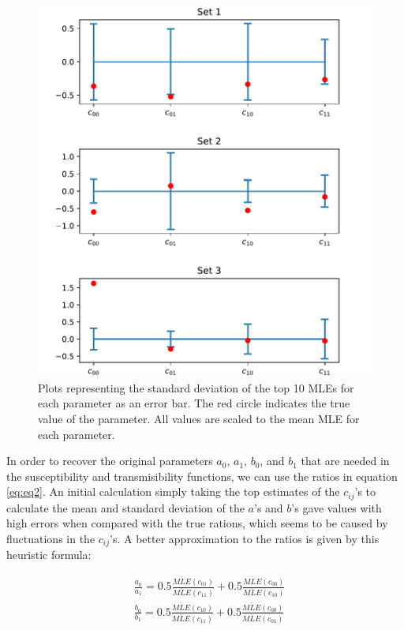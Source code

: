 \documentclass{article}
\begin{document}
\begin{figure} %
  \centering
  \includegraphics[scale=0.5]{Figure-3.pdf}
  \caption{Plots representing the standard deviation of the top 10 MLEs for each parameter as an error bar. The red circle indicates the true value of the parameter. All values are scaled to the mean MLE for each parameter.}
  \label{fig:fig3}
\end{figure}

In order to recover the original parameters $a_0$, $a_1$, $b_0$, and $b_1$ that are needed in the susceptibility and transmisibility functions, we can use the ratios in equation \ref{eq:eq2}. An initial calculation simply taking the top estimates of the $c_{ij}$'s to calculate the mean and standard deviation of the $a$'s and $b$'s gave values with high errors when compared with the true rations, which seems to be caused by fluctuations in the $c_{ij}$'s. A better approximation to the ratios is given by this heuristic formula:

\begin{equation}
\begin{aligned}
& \frac{a_0}{a_1}=0.5\frac{\overline{MLE}(c_{01})}{\overline{MLE}(c_{11})} + 0.5\frac{\overline{MLE}(c_{00})}{\overline{MLE}(c_{10})} \\
& \frac{b_0}{b_1}=0.5\frac{\overline{MLE}(c_{10})}{\overline{MLE}(c_{11})} + 0.5\frac{\overline{MLE}(c_{00})}{\overline{MLE}(c_{01})}
\end{aligned}
\label{eq:eq3}
\end{equation}
\end{document}
